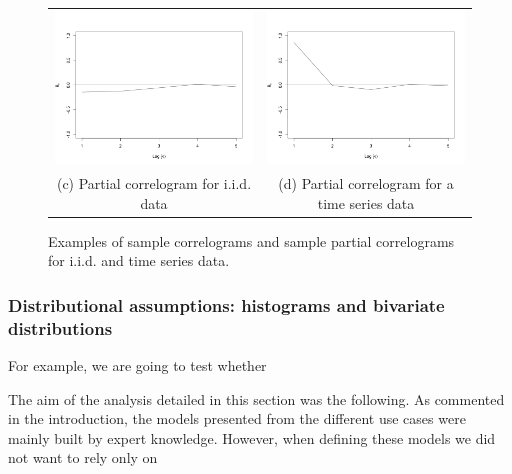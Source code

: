 \begin{figure}
\begin{center}
\begin{tabular}{cc}
\includegraphics[scale=0.25]{./figures/PartialCorrelogramGaussian} &
\includegraphics[scale=0.25]{./figures/PartialCorrelogramTimeSerie} \\
(c) Partial correlogram for i.i.d. data & (d) Partial correlogram for a time series data \\
\end{tabular}
\caption{\label{Figure:PreliminariesCorrelograms} Examples of sample correlograms and sample partial correlograms for i.i.d. and time series data. 
}
\end{center}
\end{figure}

\subsubsection*{Distributional assumptions: histograms and bivariate distributions}

For example, we are going to test whether

The aim of the analysis detailed in this section was the following. As commented in the introduction, the models presented from the different use cases were mainly built by expert knowledge. However, when defining these models we did not want to rely only on 
